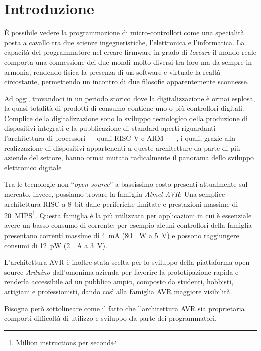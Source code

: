 \chapter{Introduzione}

È possibile vedere la programmazione di micro-controllori come una specialità posta a cavallo tra due scienze ingegneristiche, l'elettronica e l'informatica.
La capacità del programmatore nel creare firmware in grado di \textit{toccare} il mondo reale comporta una connessione dei due mondi molto diversi tra loro ma da sempre in armonia, rendendo fisica la presenza di un software e virtuale la realtà circostante, permettendo un incontro di due filosofie apparentemente sconnesse.

Ad oggi, trovandoci in un periodo storico dove la digitalizzazione è ormai esplosa, la quasi totalità di prodotti di consumo contiene uno o più controllori digitali.
Complice della digitalizzazione sono lo sviluppo tecnologico della produzione di dispositivi integrati e la pubblicazione di standard aperti riguardanti l'architettura di processori --- quali RISC-V e ARM~\cite{site:arm-licensing} ---, i quali, grazie alla realizzazione di dispositivi appartenenti a queste architetture da parte di più aziende del settore, hanno ormai mutato radicalmente il panorama dello sviluppo elettronico digitale~\cite{arm-intel-phone-market}\cite{site:arm-press-200b-chips}.

Tra le tecnologie non ``\textit{open source}'' a bassissimo costo presenti attualmente sul mercato, invece, possiamo trovare la famiglia \textit{Atmel AVR}: Una semplice architettura RISC a 8~bit dalle periferiche limitate e prestazioni massime di \SI{20}{MIPS}\footnote{Million instructions per second}.
Questa famiglia è la più utilizzata per applicazioni in cui è essenziale avere un basso consumo di corrente: per esempio alcuni controllori della famiglia presentano correnti massime di \SI{4}{\milli\ampere} (\SI{80}{\text{\mu}\watt} a \SI{5}{\volt}) e possono raggiungere consumi di \SI{12}{\pico\watt} (\SI{2}{\text{\mu}\ampere} a \SI{3}{\volt})\cite{avr:tiny4}.

L'architettura AVR è inoltre stata scelta per lo sviluppo della piattaforma open source \textit{Arduino} dall'omonima azienda per favorire la prototipazione rapida e renderla accessibile ad un pubblico ampio, composto da studenti, hobbisti, artigiani e professionisti\cite{site:arduino-about}, dando così alla famiglia AVR maggiore visibilità.

Bisogna però sottolineare come il fatto che l'architettura AVR sia proprietaria comporti difficoltà di utilizzo e sviluppo da parte dei programmatori.

